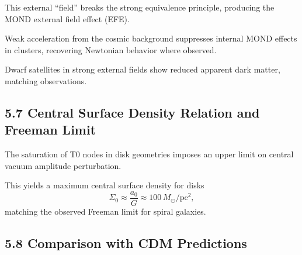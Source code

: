 \documentclass[12pt,a4paper]{article}
\begin{document}
	This external ``field'' breaks the strong equivalence principle, producing the MOND external field effect (EFE).
	
	Weak acceleration from the cosmic background suppresses internal MOND effects in clusters, recovering Newtonian behavior where observed.
	
	Dwarf satellites in strong external fields show reduced apparent dark matter, matching observations.
	
	\subsection{5.7 Central Surface Density Relation and Freeman Limit}
	
	The saturation of T0 nodes in disk geometries imposes an upper limit on central vacuum amplitude perturbation.
	
	This yields a maximum central surface density for disks
	\[
	\Sigma_0 \approx \frac{a_0}{G} \approx 100 \, M_\odot / \text{pc}^2,
	\]
	matching the observed Freeman limit for spiral galaxies.
	
	\subsection{5.8 Comparison with CDM Predictions}
	
	\begin{table}[htbp]
		\centering
		\caption{Galactic scale predictions}
		\label{tab:galactic}
	\end{table}
	
\end{document}
